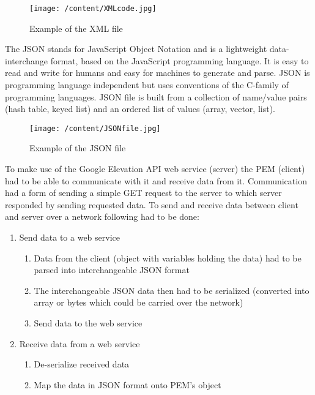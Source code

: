 \documentclass[12pt, a4paper]{report}   %
\begin{document}
\begin{enumerate}
\begin{figure}[H]
  \centering
	\texttt{[image: /content/XMLcode.jpg]}
	  \caption{Example of the XML file}
\end{figure}


The JSON stands for JavaScript Object Notation and is a lightweight data-interchange format, based on the JavaScript programming language. It is easy to read and write for humans and easy for machines to generate and parse. JSON is programming language independent but uses conventions of the C-family of programming languages. JSON file is built from a collection of name/value pairs (hash table, keyed list) and an ordered list of values (array, vector, list).


\begin{figure}[H]
  \centering
	\texttt{[image: /content/JSONfile.jpg]}
	  \caption{Example of the JSON file}
\end{figure}


To make use of the Google Elevation API web service (server) the PEM (client) had to be able to communicate with it and receive data from it. Communication had a form of sending a simple GET request to the server to which server responded by sending requested data. To send and receive data between client and server over a network following had to be done:\\

\begin{enumerate}
	\item Send data to a web service
	\begin{enumerate}
		\item Data from the client (object with variables holding the data) had to be parsed into interchangeable JSON format
		\item The interchangeable JSON data then had to be serialized (converted into array or bytes which could be carried over the network)
		\item Send data to the web service\\
	\end{enumerate}

	\item Receive data from a web service
	\begin{enumerate}
		\item De-serialize received data
		\item Map the data in JSON format onto PEM's object\\
	\end{enumerate}
\end{enumerate}


\end{enumerate}
\end{document}
